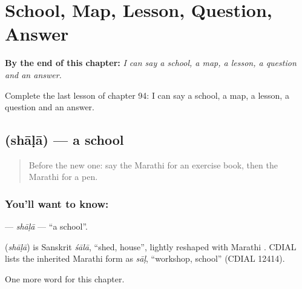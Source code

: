 
\chapter{School, Map, Lesson, Question, Answer}
\label{ch:mr-school-map-lesson-question-answer}

\begin{chapteropening}
\textbf{By the end of this chapter:} \emph{I can say a school, a map, a lesson, a question and an answer.}

Complete the last lesson of chapter 94: I can say a school, a map, a lesson, a question and an answer.
\end{chapteropening}

\section[\texorpdfstring{\mr{शाळा} (shāḷā)}{शाळा (shāḷā)}]{ (shāḷā) — a school}

\label{lesson:MR-C94-shala}



\begin{quote}
Before the new one: say the Marathi for an exercise book, then the Marathi for a pen.
\end{quote}

\subsection*{You'll want to know: }
\textbf{} — \emph{shāḷā} — \textquotedblleft{}a school\textquotedblright{}.

\begin{cousinweb}
\textbf{} (\emph{shāḷā}) is Sanskrit \emph{śālā}, \textquotedblleft{}shed, house\textquotedblright{}, lightly reshaped with Marathi \textbf{}. CDIAL lists the inherited Marathi form as \emph{sāḷ}, \textquotedblleft{}workshop, school\textquotedblright{} (CDIAL 12414).
\end{cousinweb}

\begin{grammarlens}[title={What you've built}]
One more word for this chapter.
\end{grammarlens}

